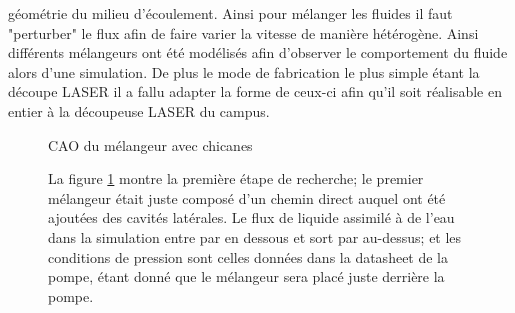 \documentclass[a4paper, 11pt]{article}
\begin{document}
géométrie du milieu d'écoulement. Ainsi pour mélanger les fluides il faut "perturber" le flux afin de faire
varier la vitesse de manière hétérogène.
Ainsi différents mélangeurs ont été modélisés afin d'observer le comportement du fluide alors
d'une simulation.
De plus le mode de fabrication le plus simple étant la découpe LASER il a fallu adapter la forme
de ceux-ci afin qu'il soit réalisable en entier à la découpeuse LASER du campus.
\newline
\begin{multicols}{2}
    \begin{figure}[H]
        \centering
        \caption{CAO du mélangeur avec chicanes}
        \label{fig:CAO_prototype_melangeur}
    \end{figure}
    \begin{figure}[H]
        La figure \ref{fig:CAO_prototype_melangeur} montre la première étape de recherche;
        le premier mélangeur était juste composé d'un chemin direct auquel ont été ajoutées
        des cavités latérales.
        Le flux de liquide assimilé à de l'eau dans la simulation entre par en dessous et sort par au-dessus;
        et les conditions de pression sont celles données dans la datasheet de la pompe, étant donné
        que le mélangeur sera placé juste derrière la pompe.
    \end{figure}
\end{multicols}
\end{document}
